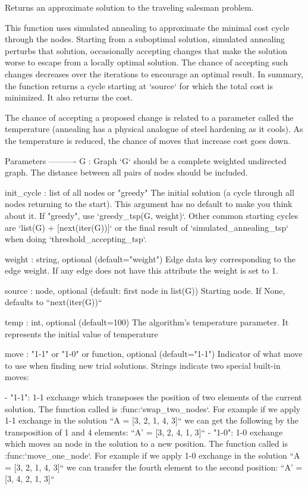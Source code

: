 \begin{DoxyVerb}Returns an approximate solution to the traveling salesman problem.

This function uses simulated annealing to approximate the minimal cost
cycle through the nodes. Starting from a suboptimal solution, simulated
annealing perturbs that solution, occasionally accepting changes that make
the solution worse to escape from a locally optimal solution. The chance
of accepting such changes decreases over the iterations to encourage
an optimal result.  In summary, the function returns a cycle starting
at `source` for which the total cost is minimized. It also returns the cost.

The chance of accepting a proposed change is related to a parameter called
the temperature (annealing has a physical analogue of steel hardening
as it cools). As the temperature is reduced, the chance of moves that
increase cost goes down.

Parameters
----------
G : Graph
    `G` should be a complete weighted undirected graph.
    The distance between all pairs of nodes should be included.

init_cycle : list of all nodes or "greedy"
    The initial solution (a cycle through all nodes returning to the start).
    This argument has no default to make you think about it.
    If "greedy", use `greedy_tsp(G, weight)`.
    Other common starting cycles are `list(G) + [next(iter(G))]` or the final
    result of `simulated_annealing_tsp` when doing `threshold_accepting_tsp`.

weight : string, optional (default="weight")
    Edge data key corresponding to the edge weight.
    If any edge does not have this attribute the weight is set to 1.

source : node, optional (default: first node in list(G))
    Starting node.  If None, defaults to ``next(iter(G))``

temp : int, optional (default=100)
    The algorithm's temperature parameter. It represents the initial
    value of temperature

move : "1-1" or "1-0" or function, optional (default="1-1")
    Indicator of what move to use when finding new trial solutions.
    Strings indicate two special built-in moves:

    - "1-1": 1-1 exchange which transposes the position
      of two elements of the current solution.
      The function called is :func:`swap_two_nodes`.
      For example if we apply 1-1 exchange in the solution
      ``A = [3, 2, 1, 4, 3]``
      we can get the following by the transposition of 1 and 4 elements:
      ``A' = [3, 2, 4, 1, 3]``
    - "1-0": 1-0 exchange which moves an node in the solution
      to a new position.
      The function called is :func:`move_one_node`.
      For example if we apply 1-0 exchange in the solution
      ``A = [3, 2, 1, 4, 3]``
      we can transfer the fourth element to the second position:
      ``A' = [3, 4, 2, 1, 3]``


\end{DoxyVerb}

